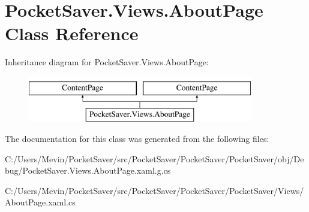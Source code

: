 \hypertarget{class_pocket_saver_1_1_views_1_1_about_page}{}\section{Pocket\+Saver.\+Views.\+About\+Page Class Reference}
\label{class_pocket_saver_1_1_views_1_1_about_page}
Inheritance diagram for Pocket\+Saver.\+Views.\+About\+Page\+:\begin{figure}[H]
\begin{center}
\leavevmode
\includegraphics[height=2.000000cm]{class_pocket_saver_1_1_views_1_1_about_page}
\end{center}
\end{figure}


The documentation for this class was generated from the following files\+:\begin{DoxyCompactItemize}
\item 
C\+:/\+Users/\+Mevin/\+Pocket\+Saver/src/\+Pocket\+Saver/\+Pocket\+Saver/\+Pocket\+Saver/obj/\+Debug/Pocket\+Saver.\+Views.\+About\+Page.\+xaml.\+g.\+cs\item 
C\+:/\+Users/\+Mevin/\+Pocket\+Saver/src/\+Pocket\+Saver/\+Pocket\+Saver/\+Pocket\+Saver/\+Views/About\+Page.\+xaml.\+cs\end{DoxyCompactItemize}

